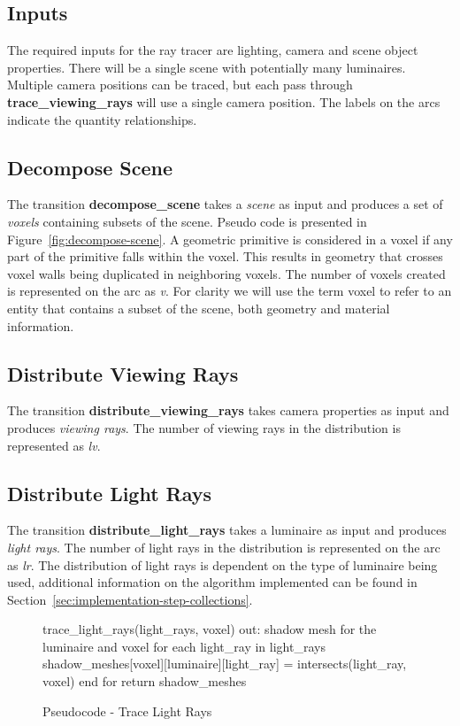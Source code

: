 \subsection{Inputs}
The required inputs for the ray tracer are lighting, camera and scene object 
properties.  There will be a single scene with potentially many luminaires.  
Multiple camera positions can be traced, but each pass through 
\textbf{trace\_viewing\_rays} will use a single camera position.  The labels 
on the arcs indicate the quantity relationships.

\subsection{Decompose Scene}
The transition \textbf{decompose\_scene} takes a \emph{scene} as input and 
produces a set of \emph{voxels} containing subsets of the scene.  Pseudo
code is presented in Figure~\ref{fig:decompose-scene}.  A geometric primitive is 
considered in a voxel if any part of the primitive falls within the voxel. This
results in geometry that crosses voxel walls being duplicated in neighboring
voxels.  The number of voxels created is represented on the arc as \emph{v}. 
For clarity we will use the term voxel to refer to an entity that contains a
subset of the scene, both geometry and material information.

\subsection{Distribute Viewing Rays}
The transition \textbf{distribute\_viewing\_rays} takes camera properties as 
input and produces \emph{viewing rays}.  The number of viewing rays in the
distribution is represented as \emph{lv}.

\subsection{Distribute Light Rays}
The transition \textbf{distribute\_light\_rays} takes a luminaire as input and 
produces \emph{light rays}.  The number of light rays in the distribution is
represented on the arc as \emph{lr}.  The distribution of light rays is
dependent on the type of luminaire being used, additional information on the
algorithm implemented can be found in
Section~\ref{sec:implementation-step-collections}.

\newpage

\begin{figure}[!htb]
\begin{algorithm}
trace_light_rays(light_rays, voxel) 
  out: shadow mesh for the luminaire and voxel
  for each light_ray in light_rays
    shadow_meshes[voxel][luminaire][light_ray] = intersects(light_ray, voxel)
  end for
return shadow_meshes
\end{algorithm}
\caption{Pseudocode - Trace Light Rays}
\label{fig:trace-light-rays}
\end{figure} 

